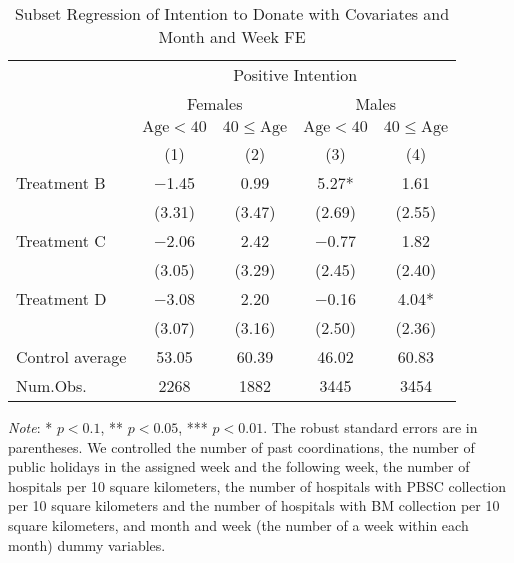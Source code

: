 \documentclass[12pt, a4paper]{article}
\begin{document}
\begin{table}[H]

\caption{\label{tab:int-lm-subset2}Subset Regression of Intention to Donate with Covariates and Month and Week FE}
\centering
\fontsize{8}{10}\selectfont
\begin{threeparttable}
\begin{tabular}[t]{lcccc}
\toprule
\multicolumn{1}{c}{ } & \multicolumn{4}{c}{Positive Intention} \\
\cmidrule(l{3pt}r{3pt}){2-5}
\multicolumn{1}{c}{ } & \multicolumn{2}{c}{Females} & \multicolumn{2}{c}{Males} \\
\cmidrule(l{3pt}r{3pt}){2-3} \cmidrule(l{3pt}r{3pt}){4-5}
\multicolumn{1}{c}{ } & \multicolumn{1}{c}{$\text{Age} < 40$} & \multicolumn{1}{c}{$40 \le \text{Age}$} & \multicolumn{1}{c}{$\text{Age} < 40$} & \multicolumn{1}{c}{$40 \le \text{Age}$} \\
\cmidrule(l{3pt}r{3pt}){2-2} \cmidrule(l{3pt}r{3pt}){3-3} \cmidrule(l{3pt}r{3pt}){4-4} \cmidrule(l{3pt}r{3pt}){5-5}
  & (1) & (2) & (3) & (4)\\
\midrule
Treatment B & \num{-1.45} & \num{0.99} & \num{5.27}* & \num{1.61}\\
 & (\num{3.31}) & (\num{3.47}) & (\num{2.69}) & (\num{2.55})\\
Treatment C & \num{-2.06} & \num{2.42} & \num{-0.77} & \num{1.82}\\
 & (\num{3.05}) & (\num{3.29}) & (\num{2.45}) & (\num{2.40})\\
Treatment D & \num{-3.08} & \num{2.20} & \num{-0.16} & \num{4.04}*\\
 & (\num{3.07}) & (\num{3.16}) & (\num{2.50}) & (\num{2.36})\\
\midrule
Control average & 53.05 & 60.39 & 46.02 & 60.83\\
Num.Obs. & \num{2268} & \num{1882} & \num{3445} & \num{3454}\\
\bottomrule
\end{tabular}
\begin{tablenotes}
\item \emph{Note}: * $p < 0.1$, ** $p < 0.05$, *** $p < 0.01$. The robust standard errors are in parentheses. We controlled the number of past coordinations, the number of public holidays in the assigned week and the following week, the number of hospitals per 10 square kilometers, the number of hospitals with PBSC collection per 10 square kilometers and the number of hospitals with BM collection per 10 square kilometers, and month and week (the number of a week within each month) dummy variables.
\end{tablenotes}
\end{threeparttable}
\end{table}
\end{document}
